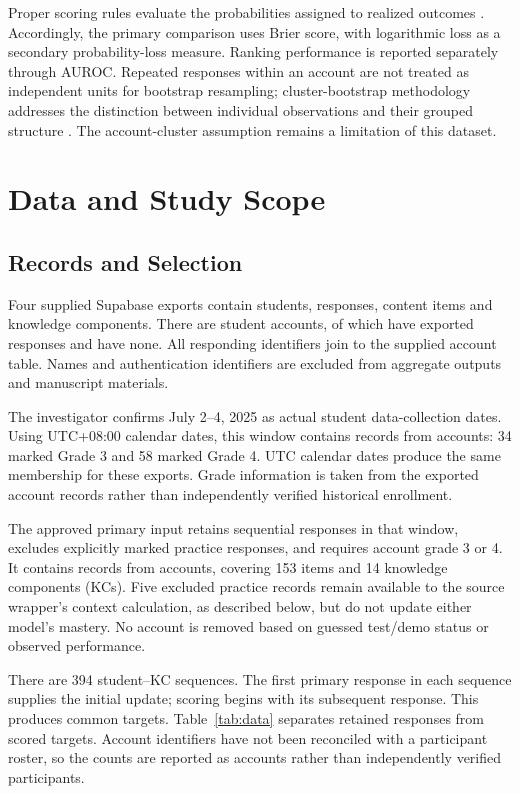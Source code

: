 \documentclass[conference]{IEEEtran}
\begin{document}
Proper scoring rules evaluate the probabilities assigned to realized outcomes \cite{gneiting2007}. Accordingly, the primary comparison uses Brier score, with logarithmic loss as a secondary probability-loss measure. Ranking performance is reported separately through AUROC. Repeated responses within an account are not treated as independent units for bootstrap resampling; cluster-bootstrap methodology addresses the distinction between individual observations and their grouped structure \cite{field2007}. The account-cluster assumption remains a limitation of this dataset.

\section{Data and Study Scope}
\subsection{Records and Selection}
Four supplied Supabase exports contain students, responses, content items and knowledge components. There are \AccountCount{} student accounts, of which \ActiveAccountCount{} have exported responses and \InactiveAccountCount{} have none. All responding identifiers join to the supplied account table. Names and authentication identifiers are excluded from aggregate outputs and manuscript materials.

The investigator confirms July 2--4, 2025 as actual student data-collection dates. Using UTC+08:00 calendar dates, this window contains \CollectionResponseCount{} records from \CollectionAccountCount{} accounts: 34 marked Grade 3 and 58 marked Grade 4. UTC calendar dates produce the same membership for these exports. Grade information is taken from the exported account records rather than independently verified historical enrollment.

The approved primary input retains sequential responses in that window, excludes explicitly marked practice responses, and requires account grade 3 or 4. It contains \CandidateResponseCount{} records from \CandidateAccountCount{} accounts, covering 153 items and 14 knowledge components (KCs). Five excluded practice records remain available to the source wrapper's context calculation, as described below, but do not update either model's mastery. No account is removed based on guessed test/demo status or observed performance.

There are 394 student--KC sequences. The first primary response in each sequence supplies the initial update; scoring begins with its subsequent response. This produces \ScoredTargets{} common targets. Table~\ref{tab:data} separates retained responses from scored targets. Account identifiers have not been reconciled with a participant roster, so the counts are reported as accounts rather than independently verified participants.
\end{document}

